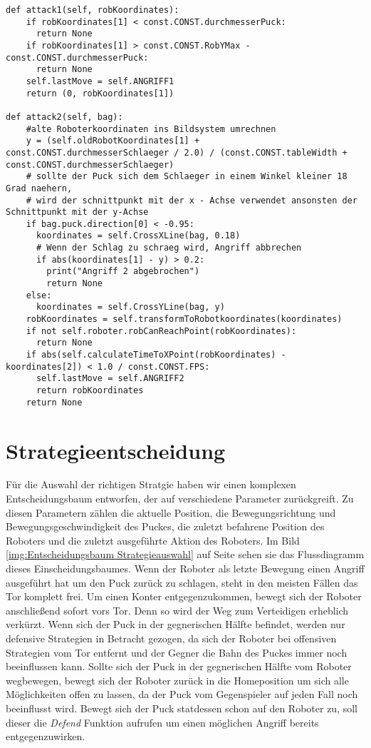 \begin{lstlisting}[caption= python-funktion für Offensivstrategien, label=lst:Offensivstrategien]
def attack1(self, robKoordinates):
	if robKoordinates[1] < const.CONST.durchmesserPuck:
	  return None
	if robKoordinates[1] > const.CONST.RobYMax - const.CONST.durchmesserPuck:
	  return None
	self.lastMove = self.ANGRIFF1
	return (0, robKoordinates[1])
    
def attack2(self, bag):
	#alte Roboterkoordinaten ins Bildsystem umrechnen
	y = (self.oldRobotKoordinates[1] + const.CONST.durchmesserSchlaeger / 2.0) / (const.CONST.tableWidth +  const.CONST.durchmesserSchlaeger)
	# sollte der Puck sich dem Schlaeger in einem Winkel kleiner 18 Grad naehern,
	# wird der schnittpunkt mit der x - Achse verwendet ansonsten der Schnittpunkt mit der y-Achse
	if bag.puck.direction[0] < -0.95:
	  koordinates = self.CrossXLine(bag, 0.18)
	  # Wenn der Schlag zu schraeg wird, Angriff abbrechen
	  if abs(koordinates[1] - y) > 0.2:
	    print("Angriff 2 abgebrochen")
	    return None
	else:
	  koordinates = self.CrossYLine(bag, y)	
	robKoordinates = self.transformToRobotkoordinates(koordinates)
	if not self.roboter.robCanReachPoint(robKoordinates):
	  return None
	if abs(self.calculateTimeToXPoint(robKoordinates) - koordinates[2]) < 1.0 / const.CONST.FPS:
	  self.lastMove = self.ANGRIFF2
	  return robKoordinates
	return None
\end{lstlisting}

\section{Strategieentscheidung}
\label{sec:Strategieentscheidung}
Für die Auswahl der richtigen Stratgie haben wir einen komplexen Entscheidungsbaum entworfen, der auf verschiedene Parameter zurückgreift. Zu diesen Parametern zählen die aktuelle Position, die Bewegungsrichtung und Bewegungsgeschwindigkeit des Puckes, die zuletzt befahrene Position des Roboters und die zuletzt ausgeführte Aktion des Roboters. Im Bild \ref{img:Entscheidungsbaum Strategieauswahl} auf Seite \pageref{img:Entscheidungsbaum Strategieauswahl} sehen sie das Flussdiagramm dieses Einscheidungsbaumes. Wenn der Roboter als letzte Bewegung einen Angriff ausgeführt hat um den Puck zurück zu schlagen, steht in den meisten Fällen das Tor komplett frei. Um einen Konter entgegenzukommen, bewegt sich der Roboter anschließend sofort vors Tor. Denn so wird der Weg zum Verteidigen erheblich verkürzt. Wenn sich der Puck in der gegnerischen Hälfte befindet, werden nur defensive Strategien in Betracht gezogen, da sich der Roboter bei offensiven Strategien vom Tor entfernt und der Gegner die Bahn des Puckes immer noch beeinflussen kann. Sollte sich der Puck in der gegnerischen Hälfte vom Roboter wegbewegen, bewegt sich der Roboter zurück in die Homeposition um sich alle Möglichkeiten offen zu lassen, da der Puck vom Gegenspieler auf jeden Fall noch beeinflusst wird. Bewegt sich der Puck statdessen schon auf den Roboter zu, soll dieser die \textit{Defend} Funktion aufrufen um einen möglichen Angriff bereits entgegenzuwirken.

